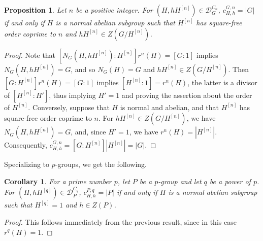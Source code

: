 \documentclass[letterpaper,12pt]{article}
\theoremstyle{plain}
\newtheorem{prop}[theorem]{Proposition}
\newtheorem{cor}[theorem]{Corollary}
\theoremstyle{definition}
\newcommand{\DnG}{\mathcal{D}^{C_n}_G}
\newcommand{\cGnHh}{c^{G,n}_{H,h}}
\begin{document}
\begin{prop}
    Let $n$ be a positive integer. For $\left(H,hH^{[n]}\right)\in \DnG$, $\cGnHh=|G|$ if and only if $H$ is a normal abelian subgroup such that $H^{[n]}$ has square-free order coprime to $n$ and $hH^{[n]}\in Z\left(G/H^{[n]}\right)$.
\end{prop}
\begin{proof}
    Note that $\left[N_G\left(H,hH^{[n]}\right):H^{[n]}\right]r^n(H)=[G:1]$ implies $N_G\left(H,hH^{[n]}\right)=G$, and so $N_G(H)=G$ and $hH^{[n]} \in Z\left(G/H^{[n]}\right)$. Then $\left[G:H^{[n]}\right]r^n(H)=[G:1]$ implies $\left[H^{[n]}:1\right]=r^n(H)$, the latter is a divisor of $\left[H^{[n]}:H'\right]$, thus implying $H'=1$ and proving the assertion about the order of $H^{[n]}$. Conversely, suppose that $H$ is normal and abelian, and that $H^{[n]}$ has square-free order coprime to $n$. For $hH^{[n]}\in Z\left(G/H^{[n]}\right)$, we have $N_G\left(H,hH^{[n]}\right)=G$, and, since $H'=1$, we have $r^n(H)=\left|H^{[n]}\right|$. Consequently, $c^{G,n}_{H,h}=\left[G:H^{[n]}\right]\left|H^{[n]}\right|=|G|$.
\end{proof}

Specializing to $p$-groups, we get the following.

\begin{cor}
    For a prime number $p$, let $P$ be a $p$-group and let $q$ be a power of $p$. For $\left(H,hH^{[q]}\right)\in \mathcal{D}^{C_q}_P$, $c^{P,q}_{H,h}=|P|$ if and only if $H$ is a normal abelian subgroup such that $H^{[q]}=1$ and $h\in Z(P)$.
\end{cor}
\begin{proof}
    This follows immediately from the previous result, since in this case $r^q(H)=1$.
\end{proof}
\end{document}
